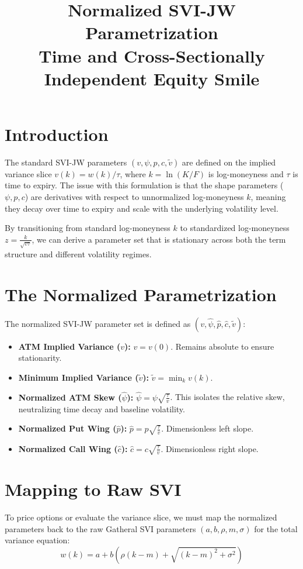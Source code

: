 \documentclass[12pt]{article}
\title{Normalized SVI-JW Parametrization \\ \large Time and Cross-Sectionally Independent Equity Smile}
\author{}
\date{}
\begin{document}
\maketitle

\section{Introduction}
The standard SVI-JW parameters $(v, \psi, p, c, \tilde{v})$ are defined on the implied variance slice $v(k) = w(k)/\tau$, where $k = \ln(K/F)$ is log-moneyness and $\tau$ is time to expiry. The issue with this formulation is that the shape parameters ($\psi, p, c$) are derivatives with respect to unnormalized log-moneyness $k$, meaning they decay over time to expiry and scale with the underlying volatility level.

By transitioning from standard log-moneyness $k$ to standardized log-moneyness $z = \frac{k}{\sqrt{v \tau}}$, we can derive a parameter set that is stationary across both the term structure and different volatility regimes.

\section{The Normalized Parametrization}
The normalized SVI-JW parameter set is defined as $(v, \hat{\psi}, \hat{p}, \hat{c}, \tilde{v})$:

\begin{itemize}
    \item \textbf{ATM Implied Variance ($v$):} $v = v(0)$. Remains absolute to ensure stationarity.
    \item \textbf{Minimum Implied Variance ($\tilde{v}$):} $\tilde{v} = \min_{k} v(k)$.
    \item \textbf{Normalized ATM Skew ($\hat{\psi}$):} $\hat{\psi} = \psi \sqrt{\frac{\tau}{v}}$. This isolates the relative skew, neutralizing time decay and baseline volatility.
    \item \textbf{Normalized Put Wing ($\hat{p}$):} $\hat{p} = p \sqrt{\frac{\tau}{v}}$. Dimensionless left slope.
    \item \textbf{Normalized Call Wing ($\hat{c}$):} $\hat{c} = c \sqrt{\frac{\tau}{v}}$. Dimensionless right slope.
\end{itemize}

\section{Mapping to Raw SVI}
To price options or evaluate the variance slice, we must map the normalized parameters back to the raw Gatheral SVI parameters $(a, b, \rho, m, \sigma)$ for the total variance equation:
\begin{equation}
    w(k) = a + b \left( \rho (k - m) + \sqrt{(k-m)^2 + \sigma^2} \right)
\end{equation}
\end{document}
